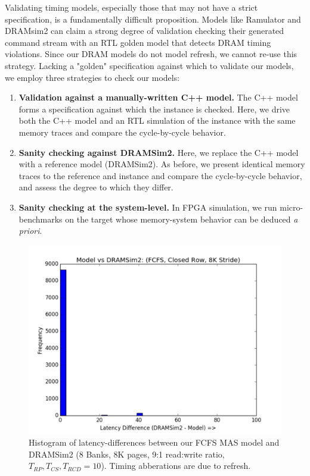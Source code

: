 Validating timing models, especially those that may not have a strict
specification, is a fundamentally difficult proposition. Models like Ramulator
and DRAMsim2 can claim a strong degree of validation checking their generated
command stream with an RTL golden model that detects DRAM timing violations.
Since our DRAM models do not model refresh, we cannot re-use this strategy.
Lacking a "golden" specification against which to validate our models, we
employ three strategies to check our models:

\begin{enumerate}
    \item \textbf{Validation against a manually-written C++ model.} The C++ model forms a
        specification against which the instance is checked. Here, we drive both the
        C++ model and an RTL simulation of the instance with the same memory
        traces and compare the cycle-by-cycle behavior.

    \item \textbf{Sanity checking against DRAMSim2.} Here, we replace the C++
        model with a reference model (DRAMSim2). As before, we present
        identical memory traces to the reference and instance and compare
        the cycle-by-cycle behavior, and assess the degree to which they differ.

    \item \textbf{Sanity checking at the system-level.} In FPGA simulation, we run
        micro-benchmarks on the target whose memory-system behavior can be
        deduced \textit{a priori}.
\end{enumerate}

\begin{figure}[t]
	\centering
	\includegraphics[width=0.75\columnwidth]{figures/close_row_stride.pdf}
    \caption{Histogram of latency-differences between our FCFS MAS model and DRAMSim2 (8 Banks, 8K pages, 9:1 read:write ratio,  $T_{RP},T_{CS},T_{RCD} =
    10$). Timing abberations are due to refresh.}
  \label{fig:error_histogram}
\end{figure}

